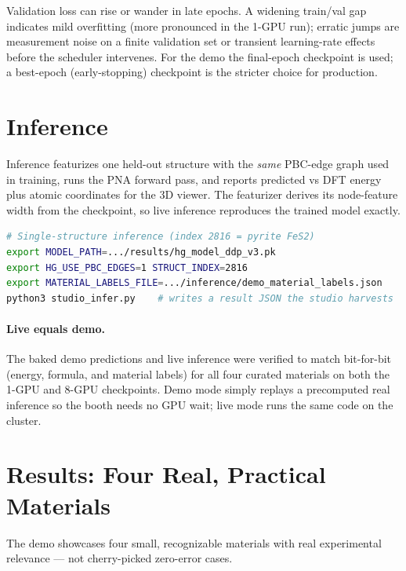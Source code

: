 \documentclass[11pt]{article}
\begin{document}
Validation loss can rise or wander in late epochs. A widening train/val gap
indicates mild overfitting (more pronounced in the 1-GPU run); erratic jumps are
measurement noise on a finite validation set or transient learning-rate effects
before the scheduler intervenes. For the demo the final-epoch checkpoint is used;
a best-epoch (early-stopping) checkpoint is the stricter choice for production.

\section{Inference}

Inference featurizes one held-out structure with the \emph{same} PBC-edge graph
used in training, runs the PNA forward pass, and reports predicted vs DFT energy
plus atomic coordinates for the 3D viewer. The featurizer derives its node-feature
width from the checkpoint, so live inference reproduces the trained model exactly.

\begin{lstlisting}[language=bash]
# Single-structure inference (index 2816 = pyrite FeS2)
export MODEL_PATH=.../results/hg_model_ddp_v3.pk
export HG_USE_PBC_EDGES=1 STRUCT_INDEX=2816
export MATERIAL_LABELS_FILE=.../inference/demo_material_labels.json
python3 studio_infer.py    # writes a result JSON the studio harvests
\end{lstlisting}

\paragraph{Live equals demo.} The baked demo predictions and live inference were
verified to match bit-for-bit (energy, formula, and material labels) for all four
curated materials on both the 1-GPU and 8-GPU checkpoints. Demo mode simply
replays a precomputed real inference so the booth needs no GPU wait; live mode runs
the same code on the cluster.

\section{Results: Four Real, Practical Materials}

The demo showcases four small, recognizable materials with real experimental
relevance --- not cherry-picked zero-error cases.
\end{document}
